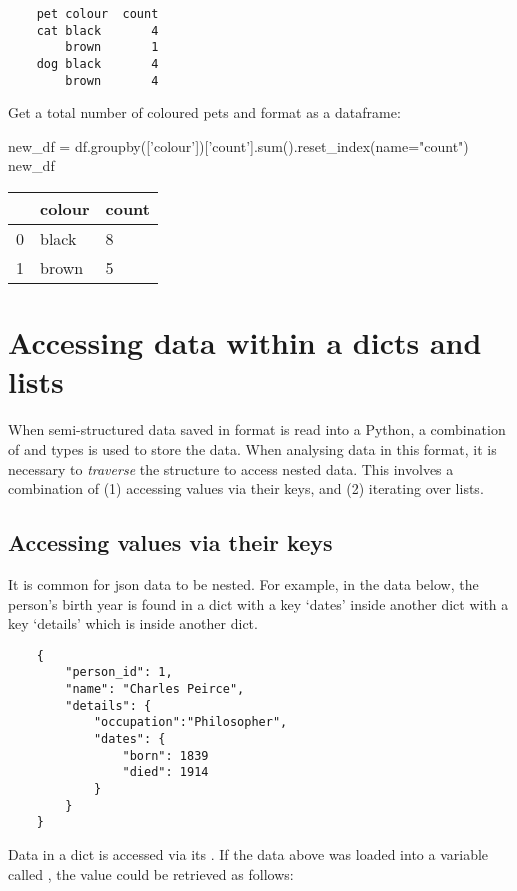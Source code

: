 \begin{verbatim}
    pet colour  count
    cat black       4
        brown       1
    dog black       4
        brown       4
\end{verbatim}

Get a total number of coloured pets and format as a dataframe:

\begin{pycode}
    new_df = df.groupby(['colour'])['count'].sum().reset_index(name="count")
    new_df
\end{pycode}

\begin{tabular}{l l l}
      & colour & count \\
    \hline
    0 & black  & 8     \\
    1 & brown  & 5     \\
\end{tabular}

\section{Accessing data within a dicts and lists}

When semi-structured data saved in  format is read into a Python, a combination of  and  types is used to store the data. When analysing data in this format, it is necessary to \textit{traverse} the structure to access nested data. This involves a combination of (1) accessing values via their keys, and (2) iterating over lists.

\subsection{Accessing values via their keys}

It is common for json data to be nested. For example, in the data below, the person's birth year is found in a dict with a key `dates' inside another dict with a key `details' which is inside another dict.

\begin{verbatim}
    {
        "person_id": 1,
        "name": "Charles Peirce",
        "details": {
            "occupation":"Philosopher",
            "dates": {
                "born": 1839
                "died": 1914
            }
        }
    }
\end{verbatim}

Data in a dict is accessed via its . If the data above was loaded into a variable called , the  value could be retrieved as follows:

